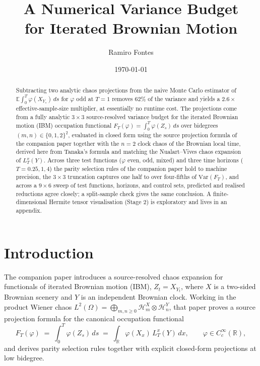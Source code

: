 \documentclass[11pt,reqno]{amsart}
\title{A Numerical Variance Budget\\
       for Iterated Brownian Motion}
\author{Ramiro Fontes}
\date{\today}
\theoremstyle{plain}
\theoremstyle{definition}
\theoremstyle{remark}
\newcommand{\R}{\mathbb{R}}
\newcommand{\E}{\mathbb{E}}
\newcommand{\Var}{\mathrm{Var}}
\newcommand{\HX}[1]{\mathcal{H}^{X}_{#1}}
\newcommand{\HY}[1]{\mathcal{H}^{Y}_{#1}}
\newcommand{\Loc}{L}
\newcommand{\IBM}{Z}
\begin{document}
\begin{abstract}
Subtracting two analytic chaos projections from the naive Monte
Carlo estimator of $\E\!\int_0^T \varphi(X_{Y_s})\,ds$ for $\varphi$
odd at $T = 1$ removes $62\%$ of the variance and yields a
$2.6\times$ effective-sample-size multiplier, at essentially no
runtime cost. The projections come from a fully analytic
$3 \times 3$ source-resolved variance budget for the iterated
Brownian motion (IBM) occupation functional
$F_T(\varphi) = \int_0^T \varphi(\IBM_s)\,ds$
over bidegrees $(m, n) \in \{0, 1, 2\}^2$, evaluated in closed form
using the source projection formula of the companion paper together
with the $n = 2$ clock chaos of the Brownian local time, derived
here from Tanaka's formula and matching the Nualart--Vives chaos
expansion of $\Loc_T^x(Y)$. Across three test functions ($\varphi$
even, odd, mixed) and three time horizons ($T = 0.25, 1, 4$) the
parity selection rules of the companion paper hold to machine
precision, the $3 \times 3$ truncation captures one half to over
four-fifths of $\Var(F_T)$, and across a $9 \times 6$ sweep of test
functions, horizons, and control sets, predicted and realised
reductions agree closely; a split-sample check gives the same
conclusion. A finite-dimensional Hermite tensor visualisation
(Stage 2) is exploratory and lives in an appendix.
\end{abstract}

\maketitle

\section{Introduction}
\label{sec:intro}

The companion paper introduces a source-resolved chaos expansion for
functionals of iterated Brownian motion (IBM), $\IBM_t = X_{Y_t}$,
where $X$ is a two-sided Brownian scenery and $Y$ is an independent
Brownian clock. Working in the product Wiener chaos
$L^2(\Omega) = \bigoplus_{m,n \ge 0} \HX{m} \otimes \HY{n}$, that
paper proves a source projection formula for the canonical occupation
functional
\[
  F_T(\varphi)
   \;=\; \int_0^T \varphi(\IBM_s)\,ds
   \;=\; \int_\R \varphi(X_x)\,\Loc_T^x(Y)\,dx,
   \qquad \varphi \in C_c^\infty(\R),
\]
and derives parity selection rules together with explicit closed-form
projections at low bidegree.
\end{document}
